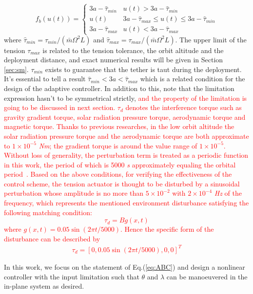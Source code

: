 \documentclass[3p]{elsarticle}
\theoremstyle{plain}
\begin{document}
\begin{equation}
f_b(u(t)) =\begin{cases}
3a-\hat{\tau}_{min}   & u(t) > 3a-\hat{\tau}_{min}\\
u(t)           & 3a - \hat{\tau}_{max} \le u(t) \le 3a-\hat{\tau}_{min}\\
3a-\hat{\tau}_{max}   & u(t) < 3a - \hat{\tau}_{max}
\end{cases}\label{eq:f_b}
\end{equation}
where $\hat{\tau}_{min} = \tau_{min}/(\bar{m}\Omega^2L)$ and $\hat{\tau}_{max} = \tau_{max}/(\bar{m}\Omega^2L)$. The upper limit of the tension $\tau_{max} $ is related to the tension tolerance, the orbit altitude and the deployment distance, and exact numerical results will be given in Section \ref{sec:sm}. $\tau_{min}$ exists to guarantee that the tether is taut during the deployment. It's essential to tell a result $\hat\tau_{min}<3a<\hat\tau_{max}$ which is a related condition for the design of the adaptive controller. In addition to this, note that the limitation expression hasn't to be symmetrical strictly, \textcolor{red}{and the property of the limitation is going to be discussed in next section.} \textcolor{red}{$\tau_d$ denotes the interference torque such as gravity gradient torque, solar radiation pressure torque, aerodynamic torque and magnetic torque. Thanks to previous researches, in the low orbit altitude the solar radiation pressure torque and the aerodynamic torque are both approximate to $1\times 10^{-5}$ \textit{Nm}; the gradient torque is around the value range of $1\times 10^{-5}$. Without loss of generality, the perturbation term is treated as a periodic function in this work, the period of which is 5000 \textit{s} approximately equaling the orbital period~\cite{liu2013calculation,inamori2015magnetic}. Based on the above conditions, for verifying the effectiveness of the control scheme, the tension actuator is thought to be disturbed by a sinusoidal perturbation whose amplitude is no more than $5\times 10^{-2}$ with $2\times 10^{-4}$ \textit{Hz} of the frequency, which represents the mentioned environment disturbance satisfying the following matching condition:
\begin{equation}
\tau_d=Bg(x,t)
\end{equation}
where $g(x,t) = 0.05\sin(2\pi t /5000)$. Hence the specific form of the disturbance can be described by
\begin{align}
\tau_d = [0,0.05\sin (2\pi t /5000),0,0]^T\label{eq:disturbance}
\end{align}}\par
In this work, we focus on the statement of Eq.(\ref{eq:ABC}) and design a nonlinear controller with the input limitation such that $\theta$ and $\lambda$ can be manoeuvered in the in-plane system as desired.
\end{document}
